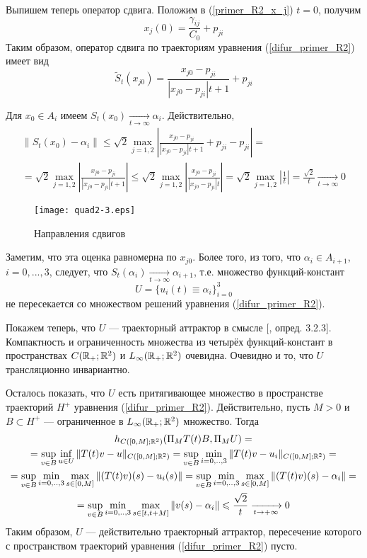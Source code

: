 Выпишем теперь оператор сдвига.
Положим в (\ref{primer_R2_x_j}) $t=0$, получим
$$
	x_j(0) = \frac{\gamma_{ij}}{C_0}+p_{ji}
$$
Таким образом, оператор сдвига по траекториям уравнения (\ref{difur_primer_R2}) имеет вид
\begin{equation}\label{primer_R2_oper_sdviga}
	\tilde{S}_t(x_{j0}) = \frac{x_{j0}-p_{ji}}{|x_{j0}-p_{ji}|t+1}+p_{ji}
\end{equation}

Для $x_0 \in A_i$ имеем $S_t(x_0) \xrightarrow[t \to \infty]{} \alpha_{i}$.
Действительно,
\begin{multline}
	\|S_t(x_0) - \alpha_i\| \leq
	\sqrt{2} \max_{j=1,2} \left| \frac{x_{j0}-p_{ji}}{|x_{j0}-p_{ji}|t+1} + p_{ji} - p_{ji}  \right| = \\ =
	\sqrt{2} \max_{j=1,2} \left| \frac{x_{j0}-p_{ji}}{|x_{j0}-p_{ji}|t+1} \right| \leq
	\sqrt{2} \max_{j=1,2} \left| \frac{x_{j0}-p_{ji}}{|x_{j0}-p_{ji}|t} \right| =
	\sqrt{2} \max_{j=1,2} \left| \frac{1}{t} \right| =
	\frac{\sqrt{2}}{t} \xrightarrow[t \to \infty]{} 0
\end{multline}

\begin{wrapfigure}[32]{r}{7.5cm}
	\texttt{[image: quad2-3.eps]}
	\caption{Направления сдвигов}
	\label{fig:somelabel3}
\end{wrapfigure}

Заметим, что эта оценка равномерна по $x_{j0}$.
Более того, из того, что $\alpha_i \in A_{i+1}$, $i=0,...,3$,
следует, что $S_t(\alpha_i) \xrightarrow[t \to \infty]{} \alpha_{i+1}$,
т.е. множество функций-констант
$$
	U = \{ u_i(t) \equiv \alpha_i \}_{i=0}^{3}
$$
не пересекается со множеством решений уравнения (\ref{difur_primer_R2}).

Покажем теперь, что $U$ --- траекторный аттрактор в смысле [\cite{Zelenaya}, опред. 3.2.3].
Компактность и ограниченность множества из четырёх функций-констант в пространствах
$C(\mathbb{R}_+; \mathbb{R}^2)$ и $L_\infty(\mathbb{R}_+; \mathbb{R}^2)$ очевидна.
Очевидно и то, что $U$ трансляционно инвариантно.

Осталось показать, что $U$ есть притягивающее множество в пространстве траекторий $H^+$ уравнения (\ref{difur_primer_R2}).
Действительно, пусть $M>0$ и $B\subset H^+$ --- ограниченное в $L_\infty(\mathbb{R}_+; \mathbb{R}^2)$ множество.
Тогда
\begin{multline*}
	h_{C([0,M];\mathbb{R}^2)}(\Pi_M T(t)B,\Pi_M U) =
	\\ =
	\sup_{v\in B} \inf_{u\in U} \| T(t) v - u \|_{C([0,M];\mathbb{R}^2)} =
	\sup_{v\in B} \min_{i=0,..,3} \| T(t) v - u_i \|_{C([0,M];\mathbb{R}^2)} =
	\\ =
	\sup_{v\in B} \min_{i=0,..,3} \max_{s\in[0,M]} \| (T(t) v)(s) - u_i(s) \| =
	\sup_{v\in B} \min_{i=0,..,3} \max_{s\in[0,M]} \| (T(t) v)(s) - \alpha_i \| =
	\\ =
	\sup_{v\in B} \min_{i=0,..,3} \max_{s\in[t,t+M]} \| v(s) - \alpha_i \| \leqslant
	\frac{\sqrt{2}}{t} \xrightarrow[t\to + \infty]{} 0
\end{multline*}
Таким образом, $U$ --- действительно траекторный аттрактор, пересечение которого с пространством траекторий
уравнения (\ref{difur_primer_R2}) пусто.


